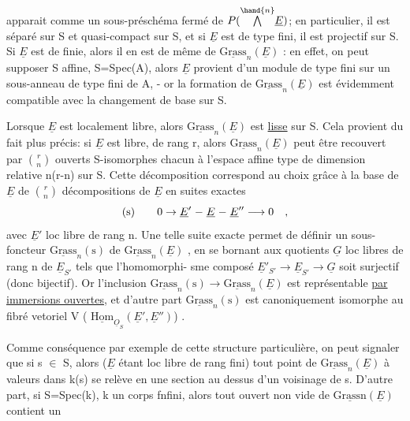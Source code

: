 
apparait comme un sous-préschéma fermé de $P(\overset{\hand{n}}{\bigwedge}\underline{E})$; en particulier, il
est séparé sur S et quasi-compact sur S, et  si $\underline{E}$  est de type fini,
il est projectif sur S. Si $\underline{E}$ est de  finie, alors
il en est de même de $\underline{\text{Grass}}_n(\underline{E})$ : en effet,  on peut
supposer S affine, S=Spec(A), alors $\underline{E}$ provient d'un module de type fini
sur un sous-anneau de type fini de A, -  or la formation de $\underline{\text{Grass}}_n(\underline{E})$
est évidemment compatible avec la changement de base sur S.

Lorsque $\underline{E}$  est localement libre, alors  $\underline{\text{Grass}}_n(\underline{E})$
est \uline{lisse} sur S. Cela provient du fait plus précis: si $\underline{E}$ est libre,
de rang r, alors  $\underline{\text{Grass}}_n(\underline{E})$  peut être recouvert par  $\binom{r}{n}$  ouverts
S-isomorphes chacun  à  l'espace affine type de dimension relative
n(r-n)  sur S.  Cette décomposition correspond au choix grâce à la base
de $\underline{E}$  de  $\binom{r}{n}$  décompositions de $\underline{E}$  en  suites
exactes
\[
\text{(s)} \qquad 0 \rightarrow \underline{E}' \relbar \underline{E} \relbar \underline{E}'' \longrightarrow 0 \quad ,
\]
avec $\underline{E}'$  loc libre de rang n.  Une telle suite exacte permet
de définir un sous-foncteur  $\underline{\text{Grass}}_n(\text{s})$  de  $\underline{\text{Grass}}_n(\underline{E})$ , en se bornant
aux  quotients  $\underline{G}$  loc libres de rang  n de  $\underline{E}_{S'}$  tels que l'homomorphi-%
sme composé  $\underline{E}'_{S'} \longrightarrow \underline{E}_{S'} \longrightarrow \underline{G}$  soit surjectif (donc bijectif). Or
l'inclusion  $\underline{\text{Grass}}_n(\text{s}) \rightarrow \underline{\text{Grass}}_n(\underline{E})$  est représentable \uline{par immersions
ouvertes}, et d'autre part  $\underline{\text{Grass}}_n(\text{s})$  est canoniquement isomorphe
au fibré vetoriel    V ( $\underline{\text{Hom}}_{\underline{O}_S}(\underline{E}',\underline{E}'')$) .

Comme conséquence par exemple de cette structure particulière,
on peut signaler que si s $\in$ S, alors ($\underline{E}$ étant loc libre de rang fini)
tout point de $\underline{\text{Grass}}_n(\underline{E})$  à valeurs dans k(s)  se relève en une section
au dessus d'un voisinage de s.  D'autre part, si S=Spec(k),  k
un corps fnfini, alors tout ouvert non vide de $\underline{\text{Grassn}}(\underline{E})$  contient un

